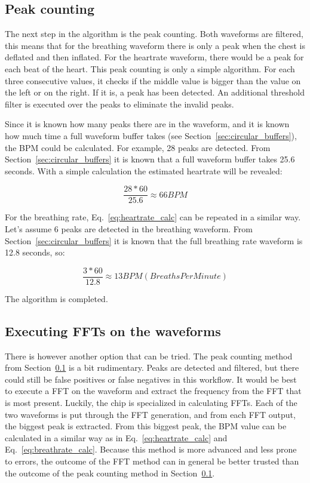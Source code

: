 \subsection{Peak counting}
\label{sec:peak_counting}
The next step in the algorithm is the peak counting. Both waveforms are filtered, this means that for the breathing waveform there is only a peak when the chest is deflated and then inflated. For the heartrate waveform, there would be a peak for each beat of the heart. This peak counting is only a simple algorithm. For each three consecutive values, it checks if the middle value is bigger than the value on the left or on the right. If it is, a peak has been detected. An additional threshold filter is executed over the peaks to eliminate the invalid peaks.

Since it is known how many peaks there are in the waveform, and it is known how much time a full waveform buffer takes (see Section~\ref{sec:circular_buffers}), the BPM could be calculated. For example, 28 peaks are detected. From Section~\ref{sec:circular_buffers} it is known that a full waveform buffer takes 25.6 seconds. With a simple calculation the estimated heartrate will be revealed:

\begin{equation}
\label{eq:heartrate_calc}
    \frac{28 * 60}{25.6} \approx 66 {BPM}
\end{equation}

For the breathing rate, Eq.~\ref{eq:heartrate_calc} can be repeated in a similar way. Let's assume 6 peaks are detected in the breathing waveform. From Section~\ref{sec:circular_buffers} it is known that the full breathing rate waveform is 12.8 seconds, so:

\begin{equation}
\label{eq:breathrate_calc}
    \frac{3 * 60}{12.8} \approx 13 {BPM (Breaths Per Minute)}
\end{equation}

The algorithm is completed.

\subsection{Executing FFTs on the waveforms}
There is however another option that can be tried. The peak counting method from Section~\ref{sec:peak_counting} is a bit rudimentary. Peaks are detected and filtered, but there could still be false positives or false negatives in this workflow. It would be best to execute a FFT on the waveform and extract the frequency from the FFT that is most present. Luckily, the chip is specialized in calculating FFTs. Each of the two waveforms is put through the FFT generation, and from each FFT output, the biggest peak is extracted. From this biggest peak, the BPM value can be calculated in a similar way as in Eq.~\ref{eq:heartrate_calc} and Eq.~\ref{eq:breathrate_calc}. Because this method is more advanced and less prone to errors, the outcome of the FFT method can in general be better trusted than the outcome of the peak counting method in Section~\ref{sec:peak_counting}. 